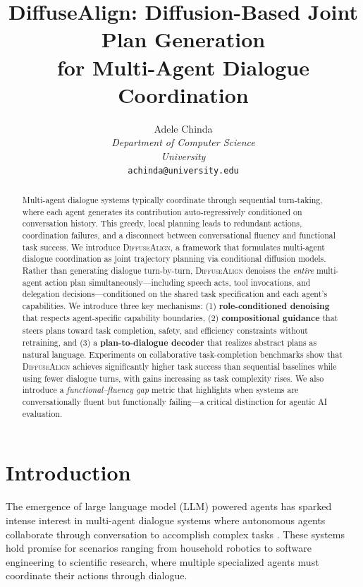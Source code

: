\documentclass[11pt]{article}
\title{DiffuseAlign: Diffusion-Based Joint Plan Generation \\ for Multi-Agent Dialogue Coordination}
\author{
  Adele Chinda \\
  \textit{Department of Computer Science} \\
  \textit{University} \\
  \texttt{achinda@university.edu}
}
\newcommand{\method}{\textsc{DiffuseAlign}}
\begin{document}
\maketitle


\begin{abstract}
Multi-agent dialogue systems typically coordinate through sequential turn-taking, where each agent generates its contribution auto-regressively conditioned on conversation history. This greedy, local planning leads to redundant actions, coordination failures, and a disconnect between conversational fluency and functional task success. We introduce \method{}, a framework that formulates multi-agent dialogue coordination as joint trajectory planning via conditional diffusion models. Rather than generating dialogue turn-by-turn, \method{} denoises the \textit{entire} multi-agent action plan simultaneously---including speech acts, tool invocations, and delegation decisions---conditioned on the shared task specification and each agent's capabilities. We introduce three key mechanisms: (1) \textbf{role-conditioned denoising} that respects agent-specific capability boundaries, (2) \textbf{compositional guidance} that steers plans toward task completion, safety, and efficiency constraints without retraining, and (3) a \textbf{plan-to-dialogue decoder} that realizes abstract plans as natural language. Experiments on collaborative task-completion benchmarks show that \method{} achieves significantly higher task success than sequential baselines while using fewer dialogue turns, with gains increasing as task complexity rises. We also introduce a \textit{functional--fluency gap} metric that highlights when systems are conversationally fluent but functionally failing---a critical distinction for agentic AI evaluation.
\end{abstract}


\section{Introduction}
\label{sec:intro}

The emergence of large language model (LLM) powered agents has sparked intense interest in multi-agent dialogue systems where autonomous agents collaborate through conversation to accomplish complex tasks \citep{autogen,dylan,camel}. These systems hold promise for scenarios ranging from household robotics to software engineering to scientific research, where multiple specialized agents must coordinate their actions through dialogue.
\end{document}
